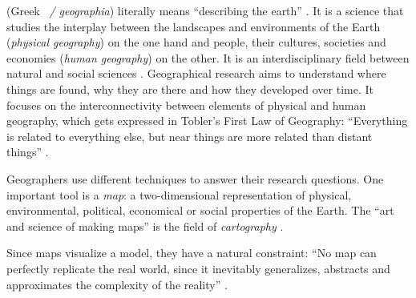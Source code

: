 (Greek ~\emph{\textgamma\textepsilon\textomega\textgamma\textrho\textalpha\textphi\textiota\textalpha / geographia}) literally means ``describing the earth''
\cite{dict}.
It is a science that studies the interplay between the landscapes and environments of the Earth (\emph{physical geography}) on the one hand and people, their cultures, societies and economies (\emph{human geography}) on the other. It is an interdisciplinary field between natural and social sciences
\cite{rgsGeography}. Geographical research aims to understand where things are found, why they are there and how they developed over time. It focuses on the interconnectivity between elements of physical and human geography, which gets expressed in Tobler's First Law of Geography: ``Everything is related to everything else, but near things are more related than distant things''
\cite{lawOfGeography}.

Geographers use different techniques to answer their research questions. One important tool is a \emph{map}: a two-dimensional representation of physical, environmental, political, economical or social properties of the Earth. The ``art and science of making maps'' is the field of \emph{cartography} \cite{cartography}.

Since maps visualize a model, they have a natural constraint: ``No map can perfectly replicate the real world, since it inevitably generalizes, abstracts and approximates the complexity of the reality''
\cite[p. 181]{knowles2008placing}.



\vspace{3em}

